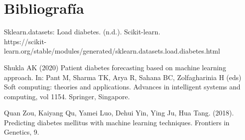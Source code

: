 \documentclass{article}
\begin{document}
\section*{Bibliografía}

Sklearn.datasets: Load diabetes. (n.d.). Scikit-learn. \\ https://scikit-learn.org/stable/modules/generated/sklearn.datasets.load.diabetes.html

Shukla AK (2020) Patient diabetes forecasting based on machine learning approach. In: Pant M, Sharma TK, Arya R, Sahana BC, Zolfagharinia H (eds) Soft computing: theories and applications. Advances in intelligent systems and computing, vol 1154. Springer, Singapore.

Quan Zou, Kaiyang Qu, Yamei Luo, Dehui Yin, Ying Ju, Hua Tang. (2018). Predicting diabetes mellitus with machine learning techniques. Frontiers in Genetics, 9.
\end{document}
